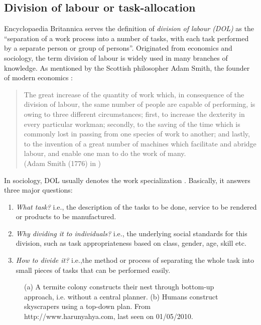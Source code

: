 \subsection{Division of labour or task-allocation}
\label{bg:def:dol}
Encyclopaedia Britannica serves the definition of {\em division of labour (DOL)} as the ``separation of a work process into a number of tasks, with each task performed by a separate person or group of persons''. Originated from economics and sociology, the term division of labour is widely used in many branches of knowledge. As mentioned by the Scottish philosopher Adam Smith, the founder of modern economics :
\begin{quotation} 
The great increase of the quantity of work which, in consequence of the division of labour, the same number of people are capable of performing, is owing to three different circumstances; first, to increase the dexterity in every particular workman; secondly, to the saving of the time which is commonly lost in passing from one species of work to another; and lastly, to the invention of a great number of machines which facilitate and abridge labour, and enable one man to do the work of many.\\
(Adam Smith (1776) in )
\end{quotation} 
In sociology, DOL usually denotes the work specialization \cite{Sayer+1992}. Basically, it answers three major questions:
\begin{enumerate}
\item {\em What task?} i.e., the description of the tasks to be done, service to be rendered or products to be manufactured.
\item {\em Why dividing it to individuals?} i.e., the underlying social standards for this division, such as task appropriateness based on class, gender, age, skill etc.
\item {\em How to divide it?} i.e.,the method or process of separating the whole task into small pieces of tasks that can be performed easily. 
\end{enumerate}
\begin{figure}[htp]
\centering
{} 
\hspace{0.25cm}
\caption{(a) A termite colony constructs their nest through bottom-up approach, i.e. without a central planner. (b) Humans construct skyscrapers using a top-down plan. From http://www.harunyahya.com, last seen on 01/05/2010.}
\label{fig:termite-nest}
\end{figure}

